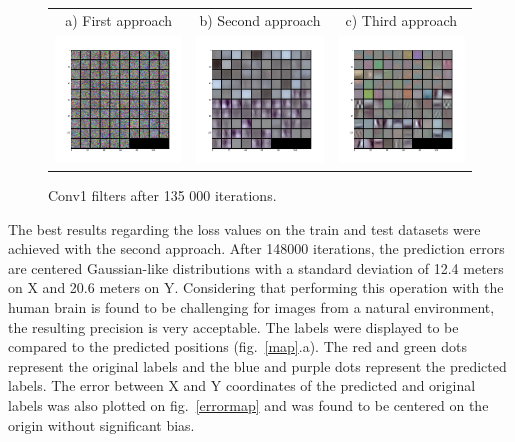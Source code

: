 \begin{figure}[htb]
\centering
\begin{tabular}{ccc}
    a) First approach & b) Second approach & c) Third approach \\
    \includegraphics[width=0.3\linewidth]{images/regression/conv1_26_135000}&
    \includegraphics[width=0.3\linewidth]{images/regression/conv1_37_135000}&
    \includegraphics[width=0.3\linewidth]{images/regression/conv1_30_135000}\\
\end{tabular}
\caption{Conv1 filters after 135 000 iterations.}
\label{1appfilter}
\label{2appfilter}
\label{3appfilter}
\end{figure}

The best results regarding the loss values on the train and test datasets were achieved with the second approach. After 148000 iterations, the prediction errors are centered Gaussian-like distributions with a standard deviation of 12.4 meters on X and 20.6 meters on Y. Considering that performing this operation with the human brain is found to be challenging for images from a natural environment, the resulting precision is very acceptable. The labels were displayed to be compared to the predicted positions (fig.~\ref{map}.a). The red and green dots represent the original labels and the blue and purple dots represent the predicted labels. The error between X and Y coordinates of the predicted and original labels was also plotted on fig.~\ref{errormap} and was found to be centered on the origin without significant bias.

